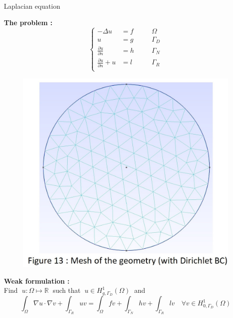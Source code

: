 \begin{frame}{Laplacian equation}
	
	\begin{minipage}{0.48\linewidth}
		\textbf{The problem :}
		$$\left\{\begin{aligned}
			-\Delta u &= f \quad&&\Omega \\
			u&=g \quad&&\Gamma_D \\
			\frac{\partial u}{\partial n} &=h \quad &&\Gamma_N \\
			\frac{\partial u}{\partial n}+u &=l \quad &&\Gamma_R \\
		\end{aligned}\right.$$
	\end{minipage}
	\begin{minipage}{0.48\linewidth}
		\begin{figure}
			\includegraphics[width=0.8\linewidth]{"images/parareal/circle_mesh.jpg"}
		\end{figure}
	\end{minipage}
	
	\textbf{Weak formulation :} \\
	Find $\; u:\Omega \mapsto \mathbb{R} \;$ such that $\; u\in H_{g,\Gamma_D}^1(\Omega) \;$ and
	$$\int_\Omega \nabla u \cdot \nabla v + \int_{\Gamma_R}uv = \int_\Omega fv + \int_{\Gamma_N}hv+\int_{\Gamma_R}lv \quad \forall v\in H_{0,\Gamma_D}^1(\Omega)$$
	
\end{frame}

